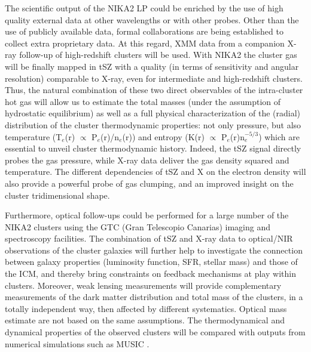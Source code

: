 \documentclass[11pt,a4paper,twoside,graphicx,color]{article}
\begin{document}
 The scientific
output of the NIKA2 LP could be enriched by the use of high quality
external data at other wavelengths or with other probes. Other than
the use of publicly available data, formal collaborations are being
established to collect extra proprietary data. At this regard, XMM
data from a companion X-ray follow-up of high-redshift clusters will
be used. With NIKA2 the cluster gas will be finally mapped in tSZ with
a quality (in terms of sensitivity and angular resolution) comparable
to X-ray, even for intermediate and high-redshift clusters. Thus, the
natural combination of these two direct observables of the
intra-cluster hot gas will allow us
to estimate the total masses (under the assumption of hydrostatic
equilibrium) as well as a full physical characterization of the
(radial) distribution of the cluster thermodynamic properties: not
only pressure, but also temperature (T$_{e}$(r) $\propto$
P$_{e}$(r)/n$_{e}$(r)) and entropy (K(r) $\propto$
P$_{e}$(r)n$_{e}^{-5/3}$) which are essential to unveil cluster
thermodynamic history. Indeed, the tSZ signal directly probes the gas
pressure, while X-ray data deliver the gas density squared and
temperature. The different dependencies of tSZ and X on the electron
density will also provide a powerful probe of gas clumping, and an
improved insight on the cluster tridimensional shape.

Furthermore, optical follow-ups could be performed for a large number
of the NIKA2 clusters using the GTC (Gran Telescopio Canarias) imaging
and spectroscopy facilities. The combination of tSZ and X-ray data to
optical/NIR observations of the cluster galaxies will further help to
investigate the connection between galaxy properties (luminosity
function, SFR, stellar mass) and those of the ICM, and thereby bring
constraints on feedback mechanisms at play within clusters. Moreover,
weak lensing measurements will provide complementary measurements of
the dark matter distribution and total mass of the clusters, in a
totally independent way, then affected by different
systematics. Optical mass estimate are not based on the same
assumptions.
The thermodynamical and dynamical properties of the observed clusters will be compared  
with outputs from numerical simulations such as MUSIC \cite{sem14}.




\end{document}
